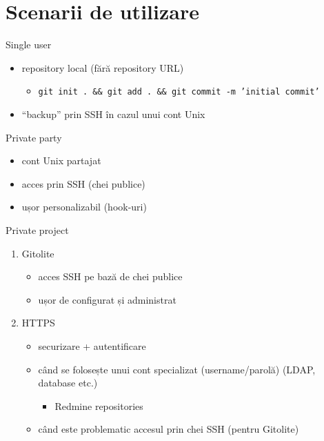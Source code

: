 \documentclass{simple}
\begin{document}
\section{Scenarii de utilizare}

\begin{frame}{Single user}
	\begin{itemize}
		\item repository local (fără repository URL)
          \begin{itemize}
            \item \texttt{git init . \&\& git add . \&\& git commit -m 'initial commit'}
          \end{itemize}
		\item ``backup'' prin SSH în cazul unui cont Unix
	\end{itemize}
\end{frame}

\begin{frame}{Private party}
	\begin{itemize}
	  \item cont Unix partajat
      \item acces prin SSH (chei publice)
      \item ușor personalizabil (hook-uri)
	\end{itemize}
\end{frame}

\begin{frame}{Private project}
  \begin{enumerate}
    \item Gitolite
      \begin{itemize}
        \item acces SSH pe bază de chei publice
        \item ușor de configurat și administrat
      \end{itemize}
    \item HTTPS
      \begin{itemize}
        \item securizare + autentificare
        \item când se folosește unui cont specializat (username/parolă) (LDAP,
        database etc.)
          \begin{itemize}
            \item Redmine repositories
          \end{itemize}
        \item când este problematic accesul prin chei SSH (pentru Gitolite)
      \end{itemize}
  \end{enumerate}
\end{frame}
\end{document}
